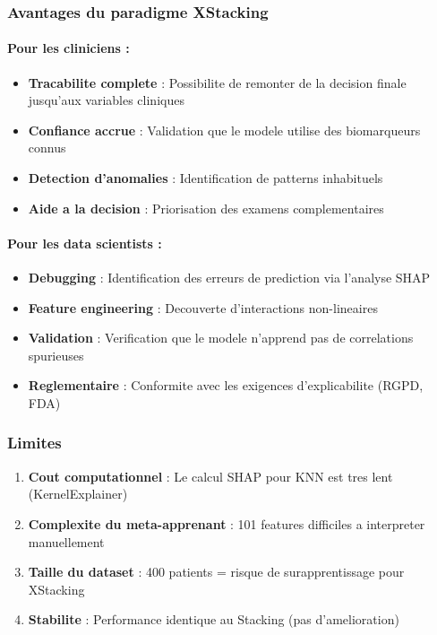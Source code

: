 \subsubsection{Avantages du paradigme XStacking}

\paragraph{Pour les cliniciens :}
\begin{itemize}
    \item \textbf{Tracabilite complete} : Possibilite de remonter de la decision finale jusqu'aux variables cliniques
    \item \textbf{Confiance accrue} : Validation que le modele utilise des biomarqueurs connus
    \item \textbf{Detection d'anomalies} : Identification de patterns inhabituels
    \item \textbf{Aide a la decision} : Priorisation des examens complementaires
\end{itemize}

\paragraph{Pour les data scientists :}
\begin{itemize}
    \item \textbf{Debugging} : Identification des erreurs de prediction via l'analyse SHAP
    \item \textbf{Feature engineering} : Decouverte d'interactions non-lineaires
    \item \textbf{Validation} : Verification que le modele n'apprend pas de correlations spurieuses
    \item \textbf{Reglementaire} : Conformite avec les exigences d'explicabilite (RGPD, FDA)
\end{itemize}

\subsubsection{Limites}

\begin{enumerate}
    \item \textbf{Cout computationnel} : Le calcul SHAP pour KNN est tres lent (KernelExplainer)
    \item \textbf{Complexite du meta-apprenant} : 101 features difficiles a interpreter manuellement
    \item \textbf{Taille du dataset} : 400 patients = risque de surapprentissage pour XStacking
    \item \textbf{Stabilite} : Performance identique au Stacking (pas d'amelioration)
\end{enumerate}

